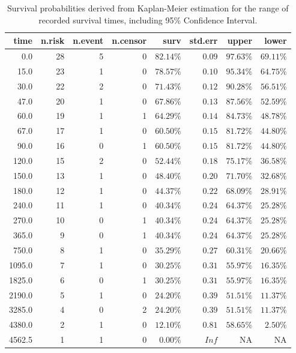 \documentclass[
  letterpaper,
  DIV=11,
  numbers=noendperiod]{scrartcl}
\begin{document}
\hypertarget{tbl-km}{}
\begin{longtable}{rrrrrrrr}
\caption{\label{tbl-km}Survival probabilities derived from Kaplan-Meier estimation for the
range of recorded survival times, including 95\% Confidence Interval. }\tabularnewline

\toprule
time & n.risk & n.event & n.censor & surv & std.err & upper & lower \\ 
\midrule
0.0 & 28 & 5 & 0 & $82.14\%$ & $0.09$ & $97.63\%$ & $69.11\%$ \\ 
15.0 & 23 & 1 & 0 & $78.57\%$ & $0.10$ & $95.34\%$ & $64.75\%$ \\ 
30.0 & 22 & 2 & 0 & $71.43\%$ & $0.12$ & $90.28\%$ & $56.51\%$ \\ 
47.0 & 20 & 1 & 0 & $67.86\%$ & $0.13$ & $87.56\%$ & $52.59\%$ \\ 
60.0 & 19 & 1 & 1 & $64.29\%$ & $0.14$ & $84.73\%$ & $48.78\%$ \\ 
67.0 & 17 & 1 & 0 & $60.50\%$ & $0.15$ & $81.72\%$ & $44.80\%$ \\ 
90.0 & 16 & 0 & 1 & $60.50\%$ & $0.15$ & $81.72\%$ & $44.80\%$ \\ 
120.0 & 15 & 2 & 0 & $52.44\%$ & $0.18$ & $75.17\%$ & $36.58\%$ \\ 
150.0 & 13 & 1 & 0 & $48.40\%$ & $0.20$ & $71.70\%$ & $32.68\%$ \\ 
180.0 & 12 & 1 & 0 & $44.37\%$ & $0.22$ & $68.09\%$ & $28.91\%$ \\ 
240.0 & 11 & 1 & 0 & $40.34\%$ & $0.24$ & $64.37\%$ & $25.28\%$ \\ 
270.0 & 10 & 0 & 1 & $40.34\%$ & $0.24$ & $64.37\%$ & $25.28\%$ \\ 
365.0 & 9 & 0 & 1 & $40.34\%$ & $0.24$ & $64.37\%$ & $25.28\%$ \\ 
750.0 & 8 & 1 & 0 & $35.29\%$ & $0.27$ & $60.31\%$ & $20.66\%$ \\ 
1095.0 & 7 & 1 & 0 & $30.25\%$ & $0.31$ & $55.97\%$ & $16.35\%$ \\ 
1825.0 & 6 & 0 & 1 & $30.25\%$ & $0.31$ & $55.97\%$ & $16.35\%$ \\ 
2190.0 & 5 & 1 & 0 & $24.20\%$ & $0.39$ & $51.51\%$ & $11.37\%$ \\ 
3285.0 & 4 & 0 & 2 & $24.20\%$ & $0.39$ & $51.51\%$ & $11.37\%$ \\ 
4380.0 & 2 & 1 & 0 & $12.10\%$ & $0.81$ & $58.65\%$ & $2.50\%$ \\ 
4562.5 & 1 & 1 & 0 & $0.00\%$ & $Inf$ & NA & NA \\ 
\bottomrule
\end{longtable}
\end{document}
